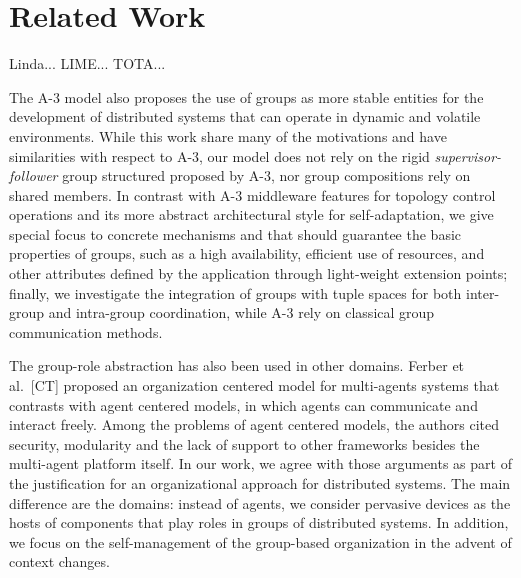 \section{Related Work}
\label{sec:related_work}

Linda... LIME... TOTA...

The A-3 model also proposes the use of groups as more stable entities for the development of distributed systems that can operate in dynamic and volatile environments. While this work share many of the motivations and have similarities with respect to A-3, our model does not rely on the rigid \textit{supervisor-follower} group structured proposed by A-3, nor group compositions rely on shared members. In contrast with A-3 middleware features for topology control operations and its more abstract architectural style for self-adaptation, we give special focus to concrete mechanisms and that should guarantee the basic properties of groups, such as a high availability, efficient use of resources, and other attributes defined by the application through light-weight extension points; finally, we investigate the integration of groups with tuple spaces for both inter-group and intra-group coordination, while A-3 rely on classical group communication methods.


The group-role abstraction has also been used in other domains. Ferber et al.~[CT] proposed an organization centered model for multi-agents systems that contrasts with agent centered models, in which agents can communicate and interact freely. Among the problems of agent centered models, the authors cited security, modularity and the lack of support to other frameworks besides the multi-agent platform itself. In our work, we agree with those arguments as part of the justification for an organizational approach for distributed systems. The main difference are the domains: instead of agents, we consider pervasive devices as the hosts of components that play roles in groups of distributed systems. In addition, we focus on the self-management of the group-based organization in the advent of context changes.


